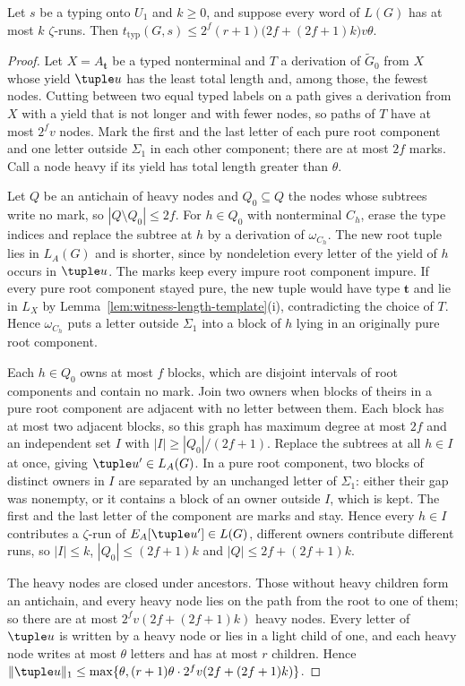 \begin{lemma}\label{lem:app-u1-runs}
Let $s$ be a typing onto $U_1$ and $k\ge0$, and suppose every word of $L(G)$ has
at most $k$ $\zeta$-runs.  Then
$t_{\mathrm{typ}}(G,s)\le2^f(r+1)\bigl(2f+(2f+1)k\bigr)v\theta$.
\end{lemma}

\begin{proof}
Let $X=A_{\mathbf t}$ be a typed nonterminal and $T$ a derivation of
$\widetilde G_0$ from $X$ whose yield $\tuple u$ has the least total length and,
among those, the fewest nodes.  Cutting between two equal typed labels on a path
gives a derivation from $X$ with a yield that is not longer and with fewer
nodes, so paths of $T$ have at most $2^fv$ nodes.  Mark the first and the last
letter of each pure root component and one letter outside $\Sigma_1$ in each
other component; there are at most $2f$ marks.  Call a node heavy if its yield
has total length greater than $\theta$.

Let $Q$ be an antichain of heavy nodes and $Q_0\subseteq Q$ the nodes whose
subtrees write no mark, so $|Q\setminus Q_0|\le2f$.  For $h\in Q_0$ with
nonterminal $C_h$, erase the type indices and replace the subtree at $h$ by a
derivation of $\omega_{C_h}$.  The new root tuple lies in $L_A(G)$ and is shorter,
since by nondeletion every letter of the yield of $h$ occurs in $\tuple u$.  The
marks keep every impure root component impure.  If every pure root component
stayed pure, the new tuple would have type $\mathbf t$ and lie in $L_X$ by
Lemma~\ref{lem:witness-length-template}(i), contradicting the choice of $T$.
Hence $\omega_{C_h}$ puts a letter outside $\Sigma_1$ into a block of $h$ lying in
an originally pure root component.

Each $h\in Q_0$ owns at most $f$ blocks, which are disjoint intervals of root
components and contain no mark.  Join two owners when blocks of theirs in a pure
root component are adjacent with no letter between them.  Each block has at most
two adjacent blocks, so this graph has maximum degree at most $2f$ and an
independent set $I$ with $|I|\ge|Q_0|/(2f+1)$.  Replace the subtrees at all
$h\in I$ at once, giving $\tuple u'\in L_A(G)$.  In a pure root component, two
blocks of distinct owners in $I$ are separated by an unchanged letter of
$\Sigma_1$: either their gap was nonempty, or it contains a block of an owner
outside $I$, which is kept.  The first and the last letter of the component are
marks and stay.  Hence every $h\in I$ contributes a $\zeta$-run of
$E_A[\tuple u']\in L(G)$, different owners contribute different runs, so
$|I|\le k$, $|Q_0|\le(2f+1)k$ and $|Q|\le2f+(2f+1)k$.

The heavy nodes are closed under ancestors.  Those without heavy children form
an antichain, and every heavy node lies on the path from the root to one of
them; so there are at most $2^fv(2f+(2f+1)k)$ heavy nodes.  Every letter of
$\tuple u$ is written by a heavy node or lies in a light child of one, and each
heavy node writes at most $\theta$ letters and has at most $r$ children.  Hence
$\|\tuple u\|_1\le\max\{\theta,(r+1)\theta\cdot2^fv(2f+(2f+1)k)\}$.
\end{proof}

